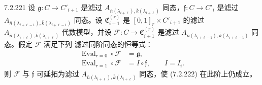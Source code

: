 \begin{lemma}{7.2.221}\label{lem:7-2-221}
设 $\mathfrak g\colon C\to C'_{i+1}$ 是滤过
$A_{\bar n(\lambda_{i+\ell}),\bar k(\lambda_{i+\ell})}$
同态，$\mathfrak f\colon C\to C'_i$ 是滤过
$A_{\bar n(\lambda_{i+\ell-1}),\bar k(\lambda_{i+\ell-1})}$
同态。设 $\mathfrak C_{i+1}^{(r)}$
是 $[0,1]_r\times C'_{i+1}$ 的滤过
$A_{\bar n(\lambda_{i+\ell}),\bar k(\lambda_{i+\ell})}$
代数模型，并设
$\mathcal F\colon C\to\mathfrak C_{i+1}^{(r)}$
是滤过
$A_{\bar n(\lambda_{i+\ell-1}),\bar k(\lambda_{i+\ell-1})}$
同态。假定 $\mathcal F$ 满足下列
滤过同阶同态的恒等式：
\begin{align}
\operatorname{Eval}_{r=0}\circ\mathcal F
&=\mathfrak g,
\tag{7.2.222.1}\label{eq:7-2-222-1}\\
\operatorname{Eval}_{r=1}\circ\mathcal F
&=I\circ\mathfrak f,
\qquad I=I_i.
\tag{7.2.222.2}\label{eq:7-2-222-2}
\end{align}
则 $\mathcal F$ 与 $\mathfrak f$ 可延拓为滤过
$A_{\bar n(\lambda_{i+\ell}),\bar k(\lambda_{i+\ell})}$
同态，使 (7.2.222) 在此阶上仍成立。
\end{lemma}

